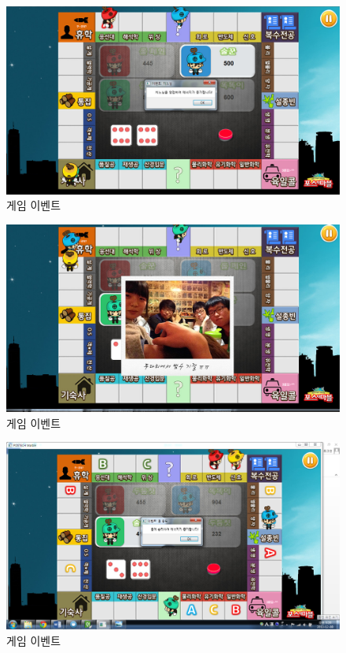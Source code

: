 \documentclass[10pt,oneside,a4paper,titlepage]{article}
\begin{document}
\begin{figure}[H]
\centering
\centerline{\includegraphics[scale=0.65]{images/9event2}}
\caption{게임 이벤트}
\end{figure}

\begin{figure}[H]
\centering
\centerline{\includegraphics[scale=0.65]{images/9event3}}
\caption{게임 이벤트}
\end{figure}

\begin{figure}[H]
\centering
\centerline{\includegraphics[scale=0.65]{images/9event4}}
\caption{게임 이벤트}
\end{figure}
\end{document}
